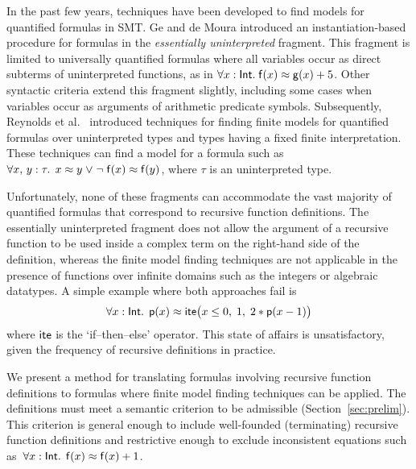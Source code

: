 In the past few years, %
techniques have been developed to find models for
quantified formulas in SMT.
Ge and de Moura \cite{GeDeM-CAV-09} introduced an instantiation-based
procedure for formulas in the \emph{essentially uninterpreted} fragment.
This fragment is limited to universally quantified formulas where all
variables occur as direct subterms of uninterpreted
functions, as in $\forall x : \mathsf{Int}.\; \mathsf{f}( x ) \approx \mathsf{g}( x ) + 5$.
Other syntactic criteria extend
this fragment slightly, including some cases when variables occur as arguments of
arithmetic predicate symbols. Subsequently, Reynolds et al.\
\cite{ReyEtAl-1-RR-13,reynolds-et-al-2013} introduced techniques for finding finite
models for quantified
formulas over uninterpreted types and types having a fixed finite
interpretation. %
These techniques can
find a model for a formula such as $\forall x,\, y : \tau.\;\, x \teq
y \vee \allowbreak \neg \con{f}( x ) \teq \con{f}( y )$, where $\tau$ is an uninterpreted type.

Unfortunately, none of these fragments can accommodate the vast majority of
quantified formulas that correspond to recursive function definitions. The
essentially uninterpreted fragment does not allow the argument of a
recursive function to be used inside a complex term on the right-hand side
of the definition,
whereas the finite model finding techniques %
are not applicable in the presence of functions over infinite domains such as the integers or
algebraic datatypes. A simple example where both approaches fail is
$$\forall x : {\mathsf{Int}}.\;\,
\mathsf{p}( x ) \approx \mathsf{ite}\bigl( x \leq 0,\allowbreak\;  1,\allowbreak\;
  2 * \mathsf{p}( x - 1 ) \bigr)$$ %
where $\mathsf{ite}$ is the `if--then--else' operator.
This state of affairs is unsatisfactory, given the frequency of
recursive definitions in practice.

\pagebreak[2]

We present a method for translating formulas involving recursive function
definitions to formulas where finite model finding techniques can be applied.
The definitions must meet a semantic criterion to be admissible 
(Section~\ref{sec:prelim}). 
This criterion is general enough to include well-founded (terminating)
recursive function definitions and restrictive enough to exclude inconsistent
equations such as \,$\forall x : {\mathsf{Int}}.\;\, \mathsf{f}(x) \approx \mathsf{f}(x) +
1$.

